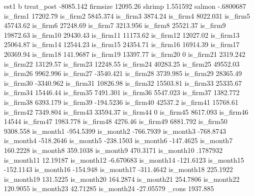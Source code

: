 	est1
	b
treat_post	-8085.142
firmsize	12095.26
shrimp	1.551592
salmon	-.6800687
is_firm1	17202.79
is_firm2	5845.374
is_firm3	3874.24
is_firm4	8022.031
is_firm5	45743.62
is_firm6	27248.69
is_firm7	3213.956
is_firm8	25521.37
is_firm9	19872.63
is_firm10	29430.43
is_firm11	11173.62
is_firm12	12027.02
is_firm13	25064.87
is_firm14	12544.23
is_firm15	24354.71
is_firm16	16914.39
is_firm17	20369.94
is_firm18	141.9687
is_firm19	13397.77
is_firm20	0
is_firm21	2319.242
is_firm22	13129.57
is_firm23	12248.55
is_firm24	40283.25
is_firm25	49552.03
is_firm26	9962.996
is_firm27	-3540.421
is_firm28	3739.985
is_firm29	28365.49
is_firm30	-3340.962
is_firm31	10826.98
is_firm32	15503.81
is_firm33	25335.67
is_firm34	15446.44
is_firm35	7491.301
is_firm36	5547.023
is_firm37	1382.772
is_firm38	6393.179
is_firm39	-194.5236
is_firm40	42537.2
is_firm41	15768.61
is_firm42	7349.804
is_firm43	33594.37
is_firm44	0
is_firm45	8617.093
is_firm46	14544
is_firm47	1983.778
is_firm48	4276.46
is_firm49	6881.792
is_firm50	9308.558
is_month1	-954.5399
is_month2	-766.7939
is_month3	-768.8743
is_month4	-518.2646
is_month5	-238.1503
is_month6	-147.4625
is_month7	160.2228
is_month8	359.1038
is_month9	470.3171
is_month10	.1787932
is_month11	12.19187
is_month12	-6.670683
is_month14	-121.6123
is_month15	-152.1143
is_month16	-154.948
is_month17	-311.4642
is_month18	225.1922
is_month19	131.5225
is_month20	164.2874
is_month21	254.7806
is_month22	120.9055
is_month23	42.71285
is_month24	-27.05579
_cons	1937.885
